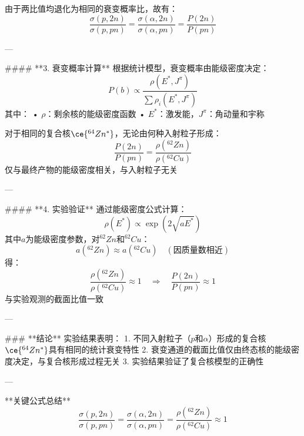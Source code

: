 \documentclass[12pt]{article}
\begin{document}
由于两比值均退化为相同的衰变概率比，故有：  
\[
\frac{\sigma(p,2n)}{\sigma(p,pn)} = \frac{\sigma(\alpha,2n)}{\sigma(\alpha,pn)} = \frac{P(2n)}{P(pn)}
\]

---

#### **3. 衰变概率计算**
根据统计模型，衰变概率由能级密度决定：  
\[
P(b) \propto \frac{\rho(E^*,J^\pi)}{\sum \rho_i(E^*,J^\pi)}
\]  
其中：  
• \(\rho\)：剩余核的能级密度函数  
• \(E^*\)：激发能，\(J^\pi\)：角动量和宇称  

对于相同的复合核\(\ce{^{64}Zn^*}\)，无论由何种入射粒子形成：  
\[
\frac{P(2n)}{P(pn)} = \frac{\rho(^{62}Zn)}{\rho(^{62}Cu)}
\]  
仅与最终产物的能级密度相关，与入射粒子无关  

---

#### **4. 实验验证**
通过能级密度公式计算：  
\[
\rho(E^*) \propto \exp\left(2\sqrt{aE^*}\right)
\]  
其中\(a\)为能级密度参数，对\(^{62}Zn\)和\(^{62}Cu\)：  
\[
a(^{62}Zn) \approx a(^{62}Cu) \quad (\text{因质量数相近})
\]  
得：  
\[
\frac{\rho(^{62}Zn)}{\rho(^{62}Cu)} \approx 1 \quad \Rightarrow \quad \frac{P(2n)}{P(pn)} \approx 1
\]  
与实验观测的截面比值一致  

---

### **结论**
实验结果表明：  
1. 不同入射粒子（\(p\)和\(\alpha\)）形成的复合核\(\ce{^{64}Zn^*}\)具有相同的统计衰变特性  
2. 衰变通道的截面比值仅由终态核的能级密度决定，与复合核形成过程无关  
3. 实验结果验证了复合核模型的正确性  

---

**关键公式总结**  
\[
\boxed{
\frac{\sigma(p,2n)}{\sigma(p,pn)} = \frac{\sigma(\alpha,2n)}{\sigma(\alpha,pn)} = \frac{\rho(^{62}Zn)}{\rho(^{62}Cu)} \approx 1
}
\]
\end{document}

